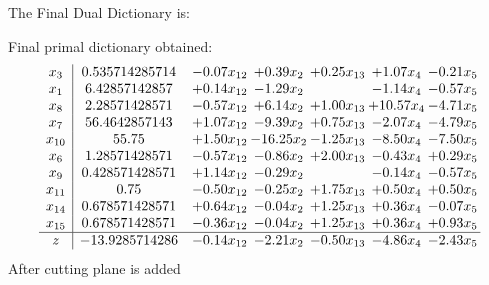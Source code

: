 \documentclass[8pt]{article}
\begin{document}
The Final Dual Dictionary is: 

 Final primal dictionary obtained: 
\[\begin{array}{c| c c@{\hskip 2pt} c@{\hskip 2pt} c@{\hskip 2pt} c@{\hskip 2pt} c@{\hskip 2pt} }
 x_{3}   &  0.535714285714 & -0.07 x_{12} & +  0.39 x_{2} & +  0.25 x_{13} & +  1.07 x_{4} & -0.21 x_{5}\\
 x_{1}   &  6.42857142857 & +  0.14 x_{12} & -1.29 x_{2} &   & -1.14 x_{4} & -0.57 x_{5}\\
 x_{8}   &  2.28571428571 & -0.57 x_{12} & +  6.14 x_{2} & +  1.00 x_{13} & + 10.57 x_{4} & -4.71 x_{5}\\
 x_{7}   &  56.4642857143 & +  1.07 x_{12} & -9.39 x_{2} & +  0.75 x_{13} & -2.07 x_{4} & -4.79 x_{5}\\
 x_{10}   &  55.75 & +  1.50 x_{12} & -16.25 x_{2} & -1.25 x_{13} & -8.50 x_{4} & -7.50 x_{5}\\
 x_{6}   &  1.28571428571 & -0.57 x_{12} & -0.86 x_{2} & +  2.00 x_{13} & -0.43 x_{4} & +  0.29 x_{5}\\
 x_{9}   &  0.428571428571 & +  1.14 x_{12} & -0.29 x_{2} &   & -0.14 x_{4} & -0.57 x_{5}\\
 x_{11}   &  0.75 & -0.50 x_{12} & -0.25 x_{2} & +  1.75 x_{13} & +  0.50 x_{4} & +  0.50 x_{5}\\
 x_{14}   &  0.678571428571 & +  0.64 x_{12} & -0.04 x_{2} & +  1.25 x_{13} & +  0.36 x_{4} & -0.07 x_{5}\\
 x_{15}   &  0.678571428571 & -0.36 x_{12} & -0.04 x_{2} & +  1.25 x_{13} & +  0.36 x_{4} & +  0.93 x_{5}\\
\hline
z    &  -13.9285714286 & -0.14 x_{12} & -2.21 x_{2} & -0.50 x_{13} & -4.86 x_{4} & -2.43 x_{5}\\
\end{array}\]
 After cutting plane is added 
\end{document}
